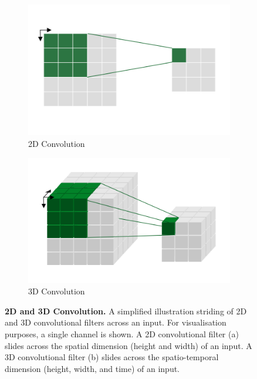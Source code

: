 \documentclass[a4paper]{article}
\begin{document}
\begin{figure}
  \centering
  \begin{subfigure}[b]{0.49\textwidth}
    \includegraphics[width=\textwidth]{./figures/2d-conv.png}
    \caption{2D Convolution}
  \end{subfigure}
  \hfill
  \begin{subfigure}[b]{0.49\textwidth}
    \includegraphics[width=\textwidth]{./figures/3d-conv.png}
    \caption{3D Convolution}
  \end{subfigure}
  \caption{
  \textbf{2D and 3D Convolution.} A simplified illustration striding of 2D and
  3D convolutional filters across an input. For visualisation purposes, a single
  channel is shown. A 2D convolutional filter (a) slides across the spatial
  dimension (height and width) of an input. A 3D convolutional filter (b) slides
across the spatio-temporal dimension (height, width, and time) of an input.}
  \label{fig:conv}
\end{figure}
\end{document}
